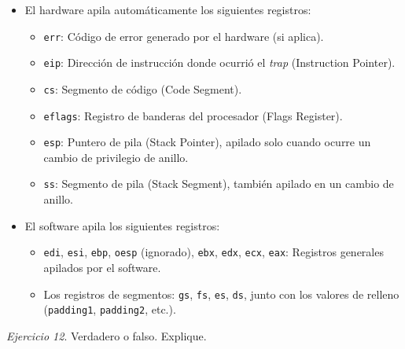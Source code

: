 \documentclass[12pt]{article}
\begin{document}
\begin{rta}
    \begin{itemize}
        \item El hardware apila automáticamente los siguientes registros:
        \begin{itemize}
            \item \texttt{err}: Código de error generado por el hardware (si aplica).
            \item \texttt{eip}: Dirección de instrucción donde ocurrió el \textit{trap} (Instruction Pointer).
            \item \texttt{cs}: Segmento de código (Code Segment).
            \item \texttt{eflags}: Registro de banderas del procesador (Flags Register).
            \item \texttt{esp}: Puntero de pila (Stack Pointer), apilado solo cuando ocurre un cambio de privilegio de anillo.
            \item \texttt{ss}: Segmento de pila (Stack Segment), también apilado en un cambio de anillo.
        \end{itemize}
        \item El software apila los siguientes registros:
        \begin{itemize}
            \item \texttt{edi}, \texttt{esi}, \texttt{ebp}, \texttt{oesp} (ignorado), \texttt{ebx}, \texttt{edx}, \texttt{ecx}, \texttt{eax}: Registros generales apilados por el software.
            \item Los registros de segmentos: \texttt{gs}, \texttt{fs}, \texttt{es}, \texttt{ds}, junto con los valores de relleno (\texttt{padding1}, \texttt{padding2}, etc.).
        \end{itemize}
    \end{itemize}
\end{rta}

\noindent \textit{Ejercicio 12}. Verdadero o falso. Explique.
\end{document}
